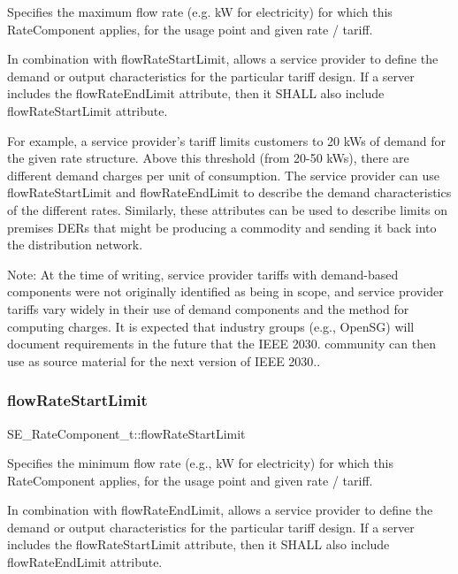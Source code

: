 Specifies the maximum flow rate (e.\+g. kW for electricity) for which this Rate\+Component applies, for the usage point and given rate / tariff.

In combination with flow\+Rate\+Start\+Limit, allows a service provider to define the demand or output characteristics for the particular tariff design. If a server includes the flow\+Rate\+End\+Limit attribute, then it S\+H\+A\+LL also include flow\+Rate\+Start\+Limit attribute.

For example, a service provider’s tariff limits customers to 20 k\+Ws of demand for the given rate structure. Above this threshold (from 20-\/50 k\+Ws), there are different demand charges per unit of consumption. The service provider can use flow\+Rate\+Start\+Limit and flow\+Rate\+End\+Limit to describe the demand characteristics of the different rates. Similarly, these attributes can be used to describe limits on premises D\+E\+Rs that might be producing a commodity and sending it back into the distribution network.

Note\+: At the time of writing, service provider tariffs with demand-\/based components were not originally identified as being in scope, and service provider tariffs vary widely in their use of demand components and the method for computing charges. It is expected that industry groups (e.\+g., Open\+SG) will document requirements in the future that the I\+E\+EE 2030. community can then use as source material for the next version of I\+E\+EE 2030.. \mbox{\label{group__RateComponent_ga4b5a6f687822495416f526dfd0f07575}} 
\subsubsection{\texorpdfstring{flow\+Rate\+Start\+Limit}{flowRateStartLimit}}
{\footnotesize\ttfamily S\+E\+\_\+\+Rate\+Component\+\_\+t\+::flow\+Rate\+Start\+Limit}

Specifies the minimum flow rate (e.\+g., kW for electricity) for which this Rate\+Component applies, for the usage point and given rate / tariff.

In combination with flow\+Rate\+End\+Limit, allows a service provider to define the demand or output characteristics for the particular tariff design. If a server includes the flow\+Rate\+Start\+Limit attribute, then it S\+H\+A\+LL also include flow\+Rate\+End\+Limit attribute. \mbox{\label{group__RateComponent_gaac1c4959b218d838c1b20379915e3abc}} 
